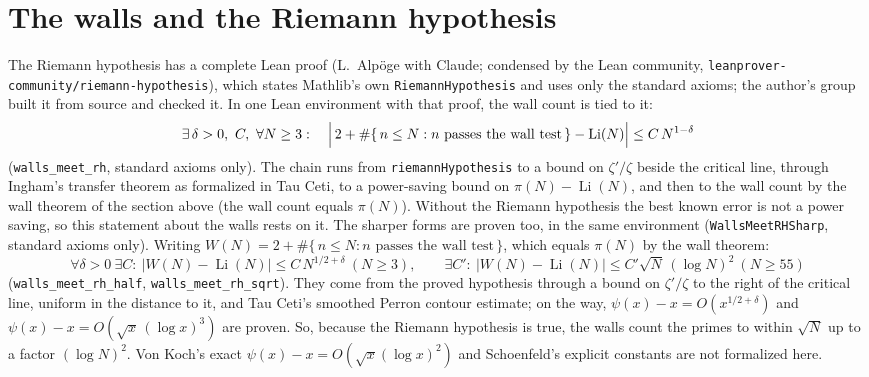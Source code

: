 \documentclass[11pt]{article}
\begin{document}
\section{The walls and the Riemann hypothesis}
The Riemann hypothesis has a complete Lean proof (L.~Alp\"oge with Claude; condensed by the Lean community, \texttt{leanprover-community/riemann-hypothesis}), which states Mathlib's own \texttt{RiemannHypothesis} and uses only the standard axioms; the author's group built it from source and checked it. In one Lean environment with that proof, the wall count is tied to it:
\[ \exists\, \delta>0,\ C,\ \forall N\ge3:\quad \Bigl|\, 2 + \#\{\, n\le N : n \text{ passes the wall test} \,\} - \operatorname{Li}(N) \Bigr| \le C\, N^{1-\delta} \]
(\texttt{walls\_meet\_rh}, standard axioms only). The chain runs from \texttt{riemannHypothesis} to a bound on $\zeta'/\zeta$ beside the critical line, through Ingham's transfer theorem as formalized in Tau Ceti, to a power-saving bound on $\pi(N) - \operatorname{Li}(N)$, and then to the wall count by the wall theorem of the section above (the wall count equals $\pi(N)$). Without the Riemann hypothesis the best known error is not a power saving, so this statement about the walls rests on it. The sharper forms are proven too, in the same environment (\texttt{WallsMeetRHSharp}, standard axioms only). Writing $W(N) = 2 + \#\{\, n\le N : n \text{ passes the wall test} \,\}$, which equals $\pi(N)$ by the wall theorem:
\[ \forall \delta>0\ \exists C:\ |W(N) - \operatorname{Li}(N)| \le C\, N^{1/2+\delta}\ (N\ge3), \qquad \exists C':\ |W(N) - \operatorname{Li}(N)| \le C' \sqrt{N}\,(\log N)^2\ (N\ge55) \]
(\texttt{walls\_meet\_rh\_half}, \texttt{walls\_meet\_rh\_sqrt}). They come from the proved hypothesis through a bound on $\zeta'/\zeta$ to the right of the critical line, uniform in the distance to it, and Tau Ceti's smoothed Perron contour estimate; on the way, $\psi(x) - x = O(x^{1/2+\delta})$ and $\psi(x) - x = O(\sqrt{x}\,(\log x)^3)$ are proven. So, because the Riemann hypothesis is true, the walls count the primes to within $\sqrt{N}$ up to a factor $(\log N)^2$. Von Koch's exact $\psi(x) - x = O(\sqrt{x}(\log x)^2)$ and Schoenfeld's explicit constants are not formalized here.
\end{document}
